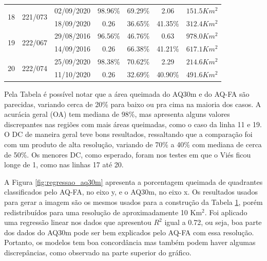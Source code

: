 \documentclass[cic,tc]{iiufrgs}
\begin{document}
\begin{table}[!htb]
\begin{tabular}{ccccccl}
\hline
\multirow{2}{*}{18} & \multirow{2}{*}{221/073} & 02/09/2020 & 98.96\% & 69.29\% & 2.06 & $151.5Km^2$ \\
                         &  & 18/09/2020 & 0.26 & 36.65\% & 41.35\% & $312.4Km^2$ \\
\hline
\multirow{2}{*}{19} & \multirow{2}{*}{222/067} & 29/08/2016 & 96.56\% & 46.76\% & 0.63 & $978.0Km^2$ \\
                         &  & 14/09/2016 & 0.26 & 66.38\% & 41.21\% & $617.1Km^2$ \\
\hline
\multirow{2}{*}{20} & \multirow{2}{*}{222/074} & 25/09/2020 & 98.38\% & 70.62\% & 2.29 & $214.6Km^2$ \\
                         &  & 11/10/2020 & 0.26 & 32.69\% & 40.90\% & $491.6Km^2$ \\
\bottomrule
\end{tabular}
\label{table:regioes_validação}
\end{table}

Pela Tabela é possível notar que a área queimada do AQ30m e do AQ-FA são parecidas, variando cerca de 20\% para baixo ou pra cima na maioria dos casos. A acurácia geral (OA) tem mediana de 98\%, mas apresenta alguns valores discrepantes nas regiões com mais áreas queimadas, como o caso da linha 11 e 19. O DC de maneira geral teve bons resultados, ressaltando que a comparação foi com um produto de alta resolução, variando de 70\% a 40\% com mediana de cerca de 50\%. Os menores DC, como esperado, foram nos testes em que o Viés ficou longe de 1, como nas linhas 17 até 20.

A Figura \ref{fig:regressao_aq30m} apresenta a porcentagem queimada de quadrantes classificados pelo AQ-FA, no eixo y, e o AQ30m, no eixo x. Os resultados usados para gerar a imagem são os mesmos usados para a construção da Tabela \ref{table:regioes_validação}, porém redistribuídos para uma resolução de aproximadamente 10 Km$^2$. Foi aplicado uma regressão linear nos dados que apresentou $R^2$ igual a 0.72, ou seja, boa parte dos dados do AQ30m pode ser bem explicados pelo AQ-FA com essa resolução. Portanto, os modelos tem boa concordância mas também podem haver algumas discrepâncias, como observado na parte superior do gráfico.
\end{document}
